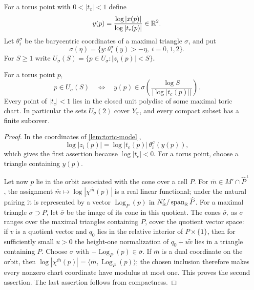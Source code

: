 For a torus point with $0<|t_c|<1$ define
\[
 y(p)=\frac{\log|x(p)|}{\log|t_c(p)|}\in\mathbb R^2.
\]
Let $\theta_i^\sigma$ be the barycentric coordinates of a maximal
triangle $\sigma$, and put
\[
 \sigma(\eta)=\{y:\theta_i^\sigma(y)>-\eta,
 \ i=0,1,2\}.
\]
For $S\geq1$ write
$U_\sigma(S)=\{p\in U_\sigma:|z_i(p)|<S\}$.

\begin{lemma}\label{lem:chart-estimates}
For a torus point $p$,
\[
 p\in U_\sigma(S)
 \quad\Longleftrightarrow\quad
 y(p)\in\sigma\left(\frac{\log S}{|\log|t_c(p)||}\right).
\]
Every point of $|t_c|<1$ lies in the closed unit polydisc of some maximal
toric chart.  In particular the sets $U_\sigma(2)$ cover $Y_\varepsilon$, and
every compact subset has a finite subcover.
\end{lemma}

\begin{proof}
In the coordinates of \cref{lem:toric-model},
\[
 \log|z_i(p)|=\log|t_c(p)|\,\theta_i^\sigma(y(p)),
\]
which gives the first assertion because $\log|t_c|<0$.  For a torus point,
choose a triangle containing $y(p)$.

Let now $p$ lie in the orbit associated with the cone over a cell $P$.
For $\bar m\in M'\cap\widehat P^{\perp}$, the assignment
$\bar m\mapsto\log|\chi^{\bar m}(p)|$ is a real linear functional; under
the natural pairing it is represented by a vector
$\operatorname{Log}_P(p)$ in
$N'_\mathbb R/\operatorname{span}_\mathbb R\widehat P$.  For a maximal triangle
$\sigma\supset P$, let $\bar\sigma$ be the image of its cone in this
quotient.  The cones $\bar\sigma$, as $\sigma$ ranges over the maximal
triangles containing $P$, cover the quotient vector space: if $v$ is a
quotient vector and $q_0$ lies in the relative interior of
$P\times\{1\}$, then for sufficiently small $u>0$ the height-one
normalization of $q_0+u\widetilde v$ lies in a triangle containing $P$.
Choose $\sigma$ with
$-\operatorname{Log}_P(p)\in\bar\sigma$.  If $\bar m$ is a dual
coordinate on the orbit, then
$\log|\chi^{\bar m}(p)|=\langle\bar m,\operatorname{Log}_P(p)\rangle$;
the chosen inclusion therefore makes every nonzero chart coordinate have
modulus at most one.  This proves the second assertion.  The last assertion
follows from compactness.
\end{proof}

